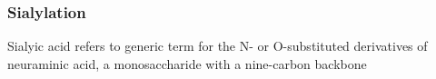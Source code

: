 \subsubsection {Sialylation}
Sialyic acid refers to generic term for the N- or O-substituted derivatives of neuraminic acid, a monosaccharide with a nine-carbon backbone